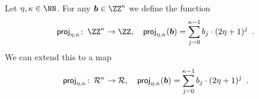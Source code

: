 \begin{definition}\label{def:proj}
  Let $\eta,\limbs\in\NN$.
  For any $\vec{b} \in \ZZ^{\limbs}$ we define the function 
  \[
    \projring\colon\, \ZZ^{\limbs} \to \ZZ,\quad \projring(\vec{b}) = \smashoperator{\sum_{j=0}^{\limbs-1}} b_j\cdot(2\eta+1)^{j}\enspace.
  \]
  We can extend this to a map 
  \[
    \projring\colon\, \ring^{\limbs} \to \ring,\quad \projring(\vec{b}) = \smashoperator{\sum_{j=0}^{\limbs-1}} b_j\cdot(2\eta+1)^{j}\enspace.
  \]
\end{definition}

